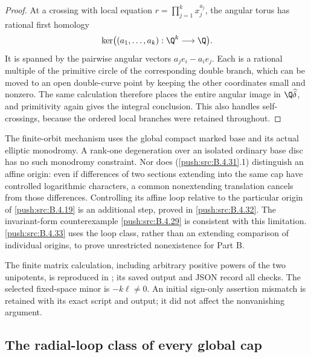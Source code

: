 \begin{proof}
At a crossing with local equation
$r=\prod_{j=1}^k x_j^{a_j}$, the angular torus has
rational first homology
\[
 \ker\bigl((a_1,\ldots,a_k):\Q^k\longrightarrow\Q\bigr).
\]
It is spanned by the pairwise angular vectors
$a_j e_i-a_i e_j$. Each is a rational multiple of the
primitive circle of the corresponding double branch,
which can be moved to an open double-curve point by
keeping the other coordinates small and nonzero.
The same calculation therefore places the entire angular
image in $\Q\widehat\delta$, and primitivity again gives
the integral conclusion. This also handles self-crossings,
because the ordered local branches were retained throughout.
\end{proof}

\begin{remark}
The finite-orbit mechanism uses the global compact marked
base and its actual elliptic monodromy. A rank-one degeneration
over an isolated ordinary base disc has no such monodromy
constraint. Nor does (\ref{push:src:B.4.31}.1) distinguish an affine origin:
even if differences of two sections extending into the same
cap have controlled logarithmic characters, a common
nonextending translation cancels from those differences.
Controlling its affine loop relative to the particular
origin of \ref{push:src:B.4.19} is an additional step, proved in \ref{push:src:B.4.32}.
The invariant-form counterexample \ref{push:src:B.4.29} is consistent with
this limitation. \ref{push:src:B.4.33} uses the loop class, rather than
an extending comparison of individual origins, to prove
unrestricted nonexistence for Part B.
\end{remark}


The finite matrix calculation, including arbitrary positive
powers of the two unipotents, is reproduced in
; its saved output and
JSON record all checks. The selected fixed-space minor is
$-k\ell\ne0$. An initial sign-only assertion mismatch is
retained with its exact script and output; it did not affect
the nonvanishing argument.

\subsection{The radial-loop class of every global cap}

